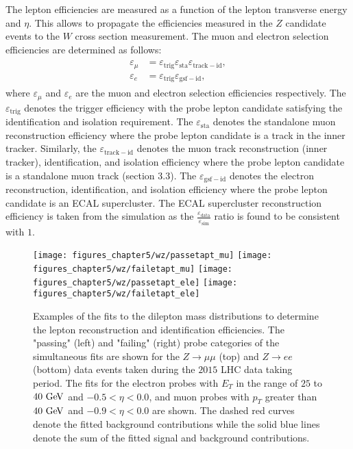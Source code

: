The lepton efficiencies are measured as a function of the lepton transverse energy and $\eta$. This allows to propagate the efficiencies measured in the $Z$ candidate events to the $W$ cross section measurement. The muon and electron selection efficiencies are determined as follows: 
\begin{eqnarray} \label{eq:eff2}
\begin{aligned}
\varepsilon_{\mu} &=  \varepsilon_{\mathrm{trig}}\varepsilon_{\mathrm{sta}}\varepsilon_{\mathrm{track-id}}, \\
\varepsilon_{e} &=  \varepsilon_{\mathrm{trig}}\varepsilon_{\mathrm{gsf-id}},
\end{aligned}
\end{eqnarray}
where $\varepsilon_{\mu}$ and $\varepsilon_{e}$ are the muon and electron selection efficiencies respectively. The $\varepsilon_{\mathrm{trig}}$ denotes the trigger efficiency with the probe lepton candidate satisfying the identification and isolation requirement. The  $\varepsilon_{\mathrm{sta}}$ denotes the standalone muon reconstruction efficiency where the probe lepton candidate is a track in the inner tracker. Similarly, the $\varepsilon_{\mathrm{track-id}}$ denotes the muon track reconstruction (inner tracker),  identification, and isolation efficiency where the probe lepton candidate is a standalone muon track (section 3.3). The $\varepsilon_{\mathrm{gsf-id}}$ denotes the electron reconstruction, identification, and isolation efficiency where the probe lepton candidate is an ECAL supercluster. The ECAL supercluster reconstruction efficiency is taken from the simulation as the $\frac{\varepsilon_{\mathrm{data}}}{\varepsilon_{\mathrm{sim}}}$ ratio is found to be consistent with $1$. 
\begin{figure}[htbp]
\centering
\texttt{[image: figures\_chapter5/wz/passetapt\_mu]}
\texttt{[image: figures\_chapter5/wz/failetapt\_mu]}
\texttt{[image: figures\_chapter5/wz/passetapt\_ele]}
\texttt{[image: figures\_chapter5/wz/failetapt\_ele]}
\caption{Examples of the fits to the dilepton mass distributions to determine the lepton reconstruction and identification efficiencies. The "passing" (left) and "failing" (right) probe categories of the simultaneous fits are shown for the $Z\rightarrow \mu\mu$ (top) and $Z\rightarrow ee$ (bottom) data events taken during the $2015$ LHC data taking period. The fits for the electron probes with $E_{T}$ in the range of $25$ to $40~\mathrm{Ge\kern -0.1em V}$ and $-0.5<\eta<0.0$, and muon probes with $p_{T}$ greater than $40~\mathrm{Ge\kern -0.1em V}$ and $-0.9<\eta<0.0$ are shown. The dashed red curves denote the fitted background contributions while the solid blue lines denote the sum of the fitted signal and background contributions.}
\label{fig:tgp}
\end{figure}

